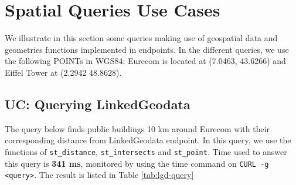 \begin{table}[!htbp]
\end{table}


\section{Spatial Queries Use Cases}
\label{sec:geoqueries}

We illustrate in this section some queries making use of geospatial data and geometries functions implemented in endpoints. In the different queries, we use the following POINTs in WGS84: Eurecom is located at (7.0463, 43.6266) and Eiffel Tower at  (2.2942 48.8628).

\subsection{UC: Querying LinkedGeodata}
\label{sec:linkedgeodata}

The query below finds public buildings 10 km around Eurecom with their corresponding distance from LinkedGeodata endpoint. In this query, we use the functions of \texttt{st\_distance}, \texttt{st\_intersects} and \texttt{st\_point}. Time used to answer this query is \textbf{341 ms}, monitored by using the time command on \texttt{CURL -g <query>}. The result is listed in Table \ref{tab:lgd-query}

